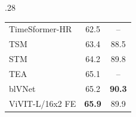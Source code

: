 \begin{table}[tb]
\begin{subtable}[t]{.28\linewidth}
{\begin{tabular}{lcc}
				TimeSformer-HR~\cite{bertasius_arxiv_2021}					& 62.5 & -- \\
				TSM~\cite{lin_tsm_cvpr_2019}    		   							& 63.4 & 88.5 \\
				STM~\cite{jiang_stm_iccv_2019}				   						& 64.2 & 89.8 \\
				TEA~\cite{li_tea_cvpr_2020}						   					& 65.1 & -- \\
				blVNet~\cite{fan_blvnet_neurips_2019}  		 						& 65.2  & \textbf{90.3} \\
				\midrule
				ViVIT-L/16x2 FE		& \textbf{65.9}  & 89.9 \\ %
				\bottomrule
			\end{tabular}
			\label{tab:sota_ssv2}
		}
	\end{subtable}
	\vspace{-\baselineskip}
\end{table}

